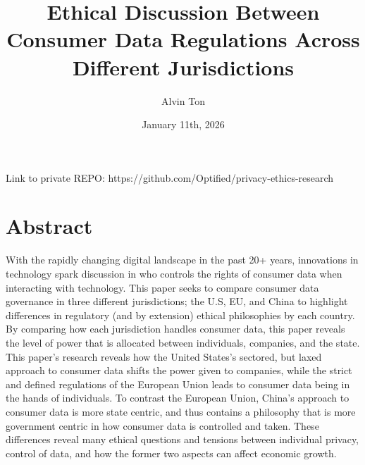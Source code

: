 \documentclass{article}
\title{Ethical Discussion Between Consumer Data Regulations Across Different Jurisdictions}
\author{Alvin Ton}
\date{January 11th, 2026}
\begin{document}
\maketitle

Link to private REPO: https://github.com/Optified/privacy-ethics-research


\section{Abstract}

With the rapidly changing digital landscape in the past 20+ years, innovations in technology spark discussion in who controls the rights of consumer data when interacting with technology. This paper seeks to compare consumer data governance in three different jurisdictions; the U.S, EU, and China to highlight differences in regulatory (and by extension) ethical philosophies by each country. By comparing how each jurisdiction handles consumer data, this paper reveals the level of power that is allocated between individuals, companies, and the state. This paper’s research reveals how the United States’s sectored, but laxed approach to consumer data shifts the power given to companies, while the strict and defined regulations of the European Union leads to consumer data being in the hands of individuals. To contrast the European Union, China’s approach to consumer data is more state centric, and thus contains a philosophy that is more government centric in how consumer data is controlled and taken. These differences reveal many ethical questions and tensions between individual privacy, control of data, and how the former two aspects can affect economic growth. 


\end{document}
